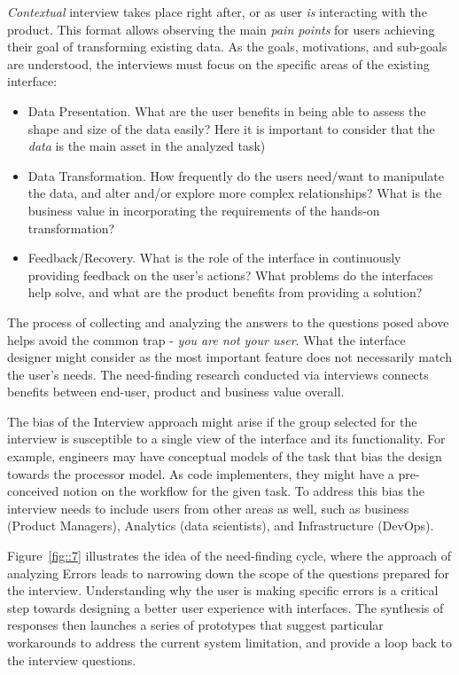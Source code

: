 \documentclass[12pt,letterpaper]{article}
\begin{document}
\textit{Contextual} interview takes place right after, or as user \textit{is} interacting with the product. This format allows observing the main \textit{pain points} for users achieving their goal of transforming existing data. As the goals, motivations, and sub-goals are understood, the interviews must focus on the specific areas of the existing interface:

\begin{itemize}
    \item Data Presentation. What are the user benefits in being able to assess the shape and size of the data easily? Here it is important to consider that the \textit{data} is the main asset in the analyzed task)  
    \item Data Transformation. How frequently do the users need/want to manipulate the data, and alter and/or explore more complex relationships? What is the business value in incorporating the requirements of the hands-on transformation?
    \item Feedback/Recovery. What is the role of the interface in continuously providing feedback on the user's actions? What problems do the interfaces help solve, and what are the product benefits from providing a solution?
\end{itemize}

The process of collecting and analyzing the answers to the questions posed above helps avoid the common trap - \textit{you are not your user}. What the interface designer might consider as the most important feature does not necessarily match the user's needs. The need-finding research conducted via interviews connects benefits between end-user, product and business value overall. 

The bias of the Interview approach might arise if the group selected for the interview is susceptible to a single view of the interface and its functionality. For example, engineers may have conceptual models of the task that bias the design towards the processor model. As code implementers, they might have a pre-conceived notion on the workflow for the given task. To address this bias the interview needs to include users from other areas as well, such as business (Product Managers), Analytics (data scientists), and Infrastructure (DevOps). 

Figure~\ref{fig::7} illustrates the idea of the need-finding cycle, where the approach of analyzing Errors leads to narrowing down the scope of the questions prepared for the interview. Understanding why the user is making specific errors is a critical step towards designing a better user experience with interfaces. The synthesis of responses then launches a series of prototypes that suggest particular workarounds to address the current system limitation, and provide a loop back to the interview questions. 
\end{document}
